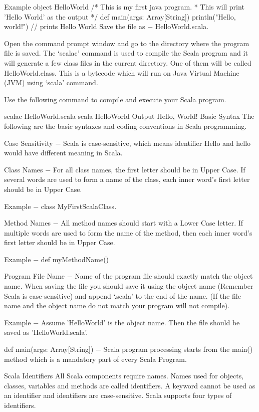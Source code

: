 Example
object HelloWorld {
   /* This is my first java program.  
   * This will print 'Hello World' as the output
   */
   def main(args: Array[String]) {
      println("Hello, world!") // prints Hello World
   }
}
Save the file as − HelloWorld.scala.

Open the command prompt window and go to the directory where the program file is saved. The ‘scalac’ command is used to compile the Scala program and it will generate a few class files in the current directory. One of them will be called HelloWorld.class. This is a bytecode which will run on Java Virtual Machine (JVM) using ‘scala’ command.

Use the following command to compile and execute your Scala program.

\> scalac HelloWorld.scala
\> scala HelloWorld
Output
Hello, World!
Basic Syntax
The following are the basic syntaxes and coding conventions in Scala programming.

Case Sensitivity − Scala is case-sensitive, which means identifier Hello and hello would have different meaning in Scala.

Class Names − For all class names, the first letter should be in Upper Case. If several words are used to form a name of the class, each inner word's first letter should be in Upper Case.

Example − class MyFirstScalaClass.

Method Names − All method names should start with a Lower Case letter. If multiple words are used to form the name of the method, then each inner word's first letter should be in Upper Case.

Example − def myMethodName()

Program File Name − Name of the program file should exactly match the object name. When saving the file you should save it using the object name (Remember Scala is case-sensitive) and append ‘.scala’ to the end of the name. (If the file name and the object name do not match your program will not compile).

Example − Assume 'HelloWorld' is the object name. Then the file should be saved as 'HelloWorld.scala'.

def main(args: Array[String]) − Scala program processing starts from the main() method which is a mandatory part of every Scala Program.

Scala Identifiers
All Scala components require names. Names used for objects, classes, variables and methods are called identifiers. A keyword cannot be used as an identifier and identifiers are case-sensitive. Scala supports four types of identifiers.

